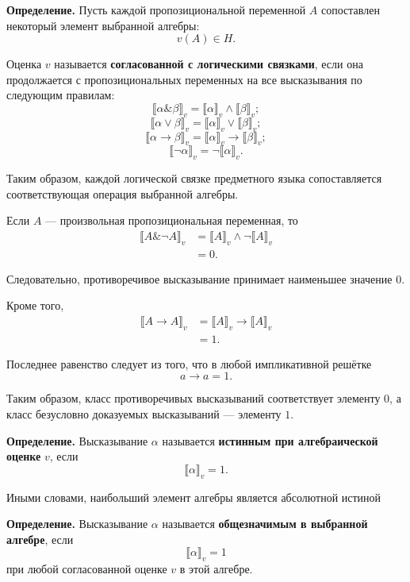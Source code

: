 \documentclass[12pt,a4paper,oneside,openany]{book}
\theoremstyle{definition}
\theoremstyle{plain}
\theoremstyle{remark}
\begin{document}
\textbf{Определение.}
Пусть каждой пропозициональной переменной \(A\) сопоставлен некоторый
элемент выбранной алгебры:
\[
v(A)\in H.
\]

Оценка \(v\) называется \textbf{согласованной с логическими связками},
если она продолжается с пропозициональных переменных на все
высказывания по следующим правилам:
\[
\llbracket
\alpha\mathbin{\&}\beta
\rrbracket_v
=
\llbracket\alpha\rrbracket_v
\wedge
\llbracket\beta\rrbracket_v;
\]
\[
\llbracket
\alpha\lor\beta
\rrbracket_v
=
\llbracket\alpha\rrbracket_v
\vee
\llbracket\beta\rrbracket_v;
\]
\[
\llbracket
\alpha\to\beta
\rrbracket_v
=
\llbracket\alpha\rrbracket_v
\to
\llbracket\beta\rrbracket_v;
\]
\[
\llbracket
\neg\alpha
\rrbracket_v
=
\neg\llbracket\alpha\rrbracket_v.
\]

Таким образом, каждой логической связке предметного языка
сопоставляется соответствующая операция выбранной алгебры.

Если \(A\) --- произвольная пропозициональная переменная, то
\[
\begin{aligned}
\llbracket
A\mathbin{\&}\neg A
\rrbracket_v
&=
\llbracket A\rrbracket_v
\wedge
\neg\llbracket A\rrbracket_v
\\
&=
0.
\end{aligned}
\]

Следовательно, противоречивое высказывание принимает наименьшее
значение \(0\).

Кроме того,
\[
\begin{aligned}
\llbracket A\to A\rrbracket_v
&=
\llbracket A\rrbracket_v
\to
\llbracket A\rrbracket_v
\\
&=
1.
\end{aligned}
\]

Последнее равенство следует из того, что в любой импликативной
решётке
\[
a\to a=1.
\]

Таким образом, класс противоречивых высказываний соответствует
элементу \(0\), а класс безусловно доказуемых высказываний ---
элементу \(1\).

\textbf{Определение.}
Высказывание \(\alpha\) называется \textbf{истинным при
алгебраической оценке} \(v\), если
\[
\llbracket\alpha\rrbracket_v=1.
\]

Иными словами, наибольший элемент алгебры является абсолютной истиной

\textbf{Определение.}
Высказывание \(\alpha\) называется \textbf{общезначимым в выбранной
алгебре}, если
\[
\llbracket\alpha\rrbracket_v=1
\]
при любой согласованной оценке \(v\) в этой алгебре.
\end{document}
